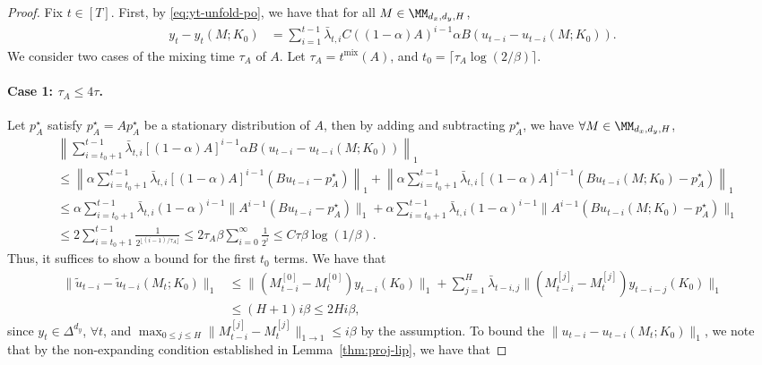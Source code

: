 \begin{proof} 
Fix $t \in [T]$. First, by \cref{eq:yt-unfold-po}, we have that for all $M\in\MM_{d_x,d_y,H}$, %
\begin{align}
\label{eq:yt-diff}
y_t-y_t(M;K_0) &= \sum_{i=1}^{t-1}\bar{\lambda}_{t,i}C ((1-\alpha)A)^{i-1}\alpha B(u_{t-i}-u_{t-i}(M;K_0)). 
\end{align}
We consider two cases of the mixing time $\tau_A$ of $A$. Let $\tau_A=t^{\mathrm{mix}}(A)$, and $t_0=\lceil \tau_A\log(2/\beta)\rceil$. 

\paragraph{Case 1: $\tau_A\le 4\tau$.} Let $p_{A}^{\star}$ satisfy $p_{A}^{\star}=Ap_{A}^{\star}$ be a stationary distribution of $A$, then by adding and subtracting $p_{A}^{\star}$, we have $\forall M\in\MM_{d_x,d_y,H}$,
\begin{align*}
&\left\|\sum_{i=t_0+1}^{t-1}\bar{\lambda}_{t,i}[(1-\alpha)A]^{i-1}\alpha B(u_{t-i}-u_{t-i}(M;K_0))\right\|_1\\
&\le \left\|\alpha \sum_{i=t_0+1}^{t-1}\bar{\lambda}_{t,i}[(1-\alpha)A]^{i-1}(Bu_{t-i}-p_{A}^{\star})\right\|_1+ \left\|\alpha\sum_{i=t_0+1}^{t-1}\bar{\lambda}_{t,i}[(1-\alpha)A]^{i-1}(Bu_{t-i}(M;K_0)-p_{A}^{\star})\right\|_1\\
&\le \alpha \sum_{i=t_0+1}^{t-1}\bar{\lambda}_{t,i}(1-\alpha)^{i-1}\|A^{i-1}(Bu_{t-i}-p_{A}^{\star})\|_1+ \alpha\sum_{i=t_0+1}^{t-1}\bar{\lambda}_{t,i}(1-\alpha)^{i-1}\|A^{i-1}(Bu_{t-i}(M;K_0)-p_{A}^{\star})\|_1\\
&\le 2 \sum_{i=t_0+1}^{t-1} \frac{1}{2^{\lfloor (i-1)/\tau_A\rfloor}}\le 2\tau_A\beta\sum_{i=0}^{\infty}\frac{1}{2^i}\le C\tau\beta\log(1/\beta).
\end{align*}
Thus, it suffices to show a bound for the first $t_0$ terms. We have that
\begin{align*}
\|\tilde{u}_{t-i}-\tilde{u}_{t-i}(M_t;K_0)\|_1&\le \|(M_{t-i}^{[0]}-M_{t}^{[0]})y_{t-i}(K_0)\|_1+\sum_{j=1}^{H}\bar{\lambda}_{t-i,j}\|(M_{t-i}^{[j]}-M_{t}^{[j]})y_{t-i-j}(K_0)\|_1\\
&\le (H+1)i\beta\le 2Hi\beta,
\end{align*}
since $y_t\in\Delta^{d_y}$, $\forall t$, and $\max_{0\le j\le H}\|M_{t-i}^{[j]}-M_{t}^{[j]}\|_{1\rightarrow 1}\le i\beta$ by the assumption. To bound the $\|u_{t-i}-u_{t-i}(M_t;K_0)\|_1$, we note that by the non-expanding condition established in Lemma~\ref{thm:proj-lip}, we have that

\end{proof}
